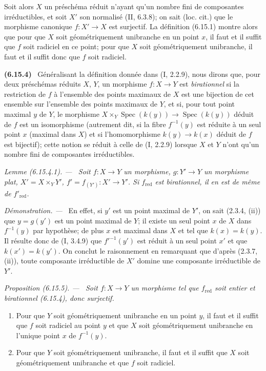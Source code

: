 \documentclass[10pt,oneside]{book}
\makeatletter
\newenvironment{env}[1][]{\par\medskip\noindent\textbf{(#1)}\ }{\par}
\newenvironment{proposition}[1][]{%
  \par\medskip\noindent\itshape Proposition (#1). ---\ }{\par}
\newenvironment{lemma}[1][]{%
  \par\medskip\noindent\itshape Lemme (#1). ---\ }{\par}
\newenvironment{proof}{%
  \par\medskip\noindent\textit{Démonstration. ---\ }}{\par}
\newcommand{\EGAReaderTarget}[2]{\hypertarget{#1}{}\@bsphack\begingroup\def\@currentHref{#1}\label{#2}\endgroup\@esphack}
\makeatother
\begin{document}
Soit alors $X$ un préschéma réduit n'ayant qu'un nombre fini de
composantes irréductibles, et soit $X'$ son normalisé (II, 6.3.8); on sait
(loc. cit.) que le morphisme canonique $f:X'\to X$ est surjectif. La
définition (6.15.1) montre alors que pour que $X$ soit géométriquement
unibranche en un point $x$, il faut et il suffit que $f$ soit radiciel en ce
point; pour que $X$ soit géométriquement unibranche, il faut et il suffit
donc que $f$ soit radiciel.

\begin{env}[6.15.4]
\EGAReaderTarget{ega4.c04.statement.6-15-4}{IV.2.s6.15.4-fr}
Généralisant la définition donnée dans (I, 2.2.9), nous dirons que, pour
deux préschémas réduits $X$, $Y$, un morphisme $f:X\to Y$ est
\emph{birationnel} si la restriction de $f$ à l'ensemble des points
maximaux de $X$ est une bijection de cet ensemble sur l'ensemble des points
maximaux de $Y$, et si, pour tout point maximal $y$ de $Y$, le morphisme
$X\times_Y\operatorname{Spec}(k(y))\to\operatorname{Spec}(k(y))$ déduit de
$f$ est un isomorphisme (autrement dit, si la fibre $f^{-1}(y)$ est réduite
à un seul point $x$ (maximal dans $X$) et si l'homomorphisme
$k(y)\to k(x)$ déduit de $f$ est bijectif); cette notion se réduit à celle
de (I, 2.2.9) lorsque $X$ et $Y$ n'ont qu'un nombre fini de composantes
irréductibles.
\end{env}

\begin{lemma}[6.15.4.1]
\label{IV.2.s6.15.4.1-fr}
Soit $f:X\to Y$ un morphisme, $g:Y'\to Y$ un morphisme plat,
$X'=X\times_Y Y'$, $f'=f_{(Y')}:X'\to Y'$. Si $f_{\mathrm{red}}$ est
birationnel, il en est de même de $f'_{\mathrm{red}}$.
\end{lemma}

\begin{proof}
En effet, si $y'$ est un point maximal de $Y'$, on sait (2.3.4, (ii)) que
$y=g(y')$ est un point maximal de $Y$; il existe un seul point $x$ de $X$
dans $f^{-1}(y)$ par hypothèse; de plus $x$ est maximal dans $X$ et tel que
$k(x)=k(y)$. Il résulte donc de (I, 3.4.9) que $f'^{-1}(y')$ est réduit à
un seul point $x'$ et que $k(x')=k(y')$. On conclut le raisonnement en
remarquant que d'après (2.3.7, (ii)), toute composante irréductible de $X'$
domine une composante irréductible de $Y'$.
\end{proof}

\begin{proposition}[6.15.5]
\label{IV.2.s6.15.5-fr}
Soit $f:X\to Y$ un morphisme tel que $f_{\mathrm{red}}$ soit entier et
birationnel (6.15.4), donc surjectif.
\begin{enumerate}
\item[(i)] Pour que $Y$ soit géométriquement unibranche en un point $y$,
il faut et il suffit que $f$ soit radiciel au point $y$ et que $X$ soit
géométriquement unibranche en l'unique point $x$ de $f^{-1}(y)$.
\item[(ii)] Pour que $Y$ soit géométriquement unibranche, il faut et il
suffit que $X$ soit géométriquement unibranche et que $f$ soit radiciel.
\end{enumerate}
\end{proposition}
\end{document}
